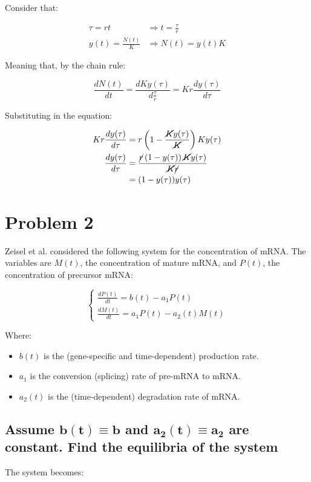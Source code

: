   Consider that:

  \begin{align*}
    \tau = rt &\Rightarrow t = \frac{\tau}{r}\\
    y(t) = \frac{N(t)}{K} &\Rightarrow N(t) = y(t)K
  \end{align*}

  Meaning that, by the chain rule:

  $$\frac{dN(t)}{dt} = \frac{dKy(\tau)}{d\frac{\tau}{r}} = Kr\frac{dy(\tau)}{d\tau}$$

  Substituting in the equation:

  \begin{align*}
    Kr\frac{dy(\tau)}{d\tau} &= r\left(1-\frac{\cancel{K}y(\tau)}{\cancel{K}}\right)Ky(\tau)\\
    \frac{dy(\tau)}{d\tau} &=  \frac{\cancel{r}\left(1-y(\tau)\right)\cancel{K}y(\tau)}{\cancel{K}\cancel{r}}\\
                           &=(1-y(\tau))y(\tau)
  \end{align*}



\section{Problem 2}
Zeisel et al. considered the following system for the concentration of mRNA.
The variables are $M(t)$, the concentration of mature mRNA, and $P(t)$, the concentration of precursor mRNA:

$$\begin{cases}
  \frac{dP(t)}{dt} = b(t) - a_1P(t)\\
  \frac{dM(t)}{dt} = a_1P(t) - a_2(t)M(t)
\end{cases}$$

Where:

\begin{multicols}{2}
  \begin{itemize}
    \item $b(t)$ is the (gene-specific and time-dependent) production rate.
    \item $a_1$ is the conversion (splicing) rate of pre-mRNA to mRNA.
    \item $a_2(t)$ is the (time-dependent) degradation rate of mRNA.
  \end{itemize}
\end{multicols}

  \subsection{Assume $\mathbf{b(t) \equiv b}$ and $\mathbf{a_2(t) \equiv a_2}$ are constant. Find the equilibria of the system}
  The system becomes:

